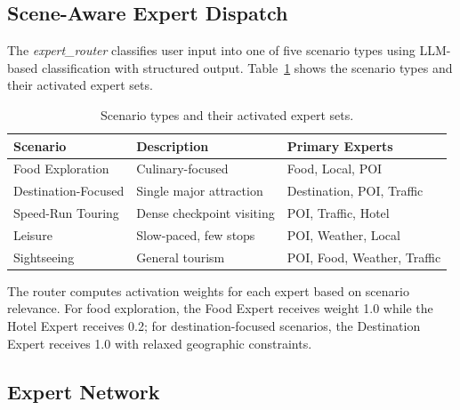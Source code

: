 \subsection{Scene-Aware Expert Dispatch}

The \textit{expert\_router} classifies user input into one of five scenario types using LLM-based classification with structured output. Table~\ref{tab:scenarios} shows the scenario types and their activated expert sets.

\begin{table}[H]
\centering
\caption{Scenario types and their activated expert sets.}
\label{tab:scenarios}
\begin{tabular}{@{}lll@{}}
\toprule
\textbf{Scenario} & \textbf{Description} & \textbf{Primary Experts} \\
\midrule
Food Exploration & Culinary-focused & Food, Local, POI \\
Destination-Focused & Single major attraction & Destination, POI, Traffic \\
Speed-Run Touring & Dense checkpoint visiting & POI, Traffic, Hotel \\
Leisure & Slow-paced, few stops & POI, Weather, Local \\
Sightseeing & General tourism & POI, Food, Weather, Traffic \\
\bottomrule
\end{tabular}
\end{table}

The router computes activation weights for each expert based on scenario relevance. For food exploration, the Food Expert receives weight 1.0 while the Hotel Expert receives 0.2; for destination-focused scenarios, the Destination Expert receives 1.0 with relaxed geographic constraints.

\subsection{Expert Network}

